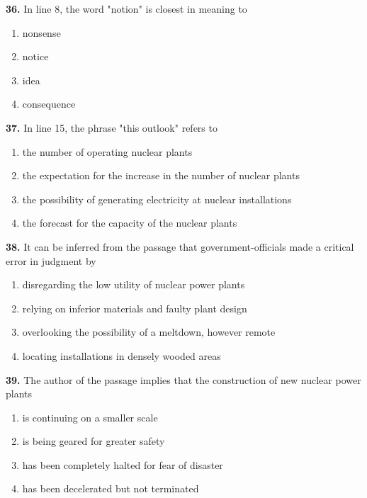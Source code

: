\documentclass[12pt]{article}
\begin{document}
\par
\vspace{0.25\baselineskip}
\noindent\textbf{36.} In line 8, the word "notion" is closest in meaning to
\begin{enumerate}[label=(\Alph*),leftmargin=*,itemsep=0.2em]
\item nonsense
\item notice
\item idea
\item consequence
\end{enumerate}
\par
\vspace{0.25\baselineskip}
\noindent\textbf{37.} In line 15, the phrase "this outlook" refers to
\begin{enumerate}[label=(\Alph*),leftmargin=*,itemsep=0.2em]
\item the number of operating nuclear plants
\item the expectation for the increase in the number of nuclear plants
\item the possibility of generating electricity at nuclear installations
\item the forecast for the capacity of the nuclear plants
\end{enumerate}
\par
\vspace{0.25\baselineskip}
\noindent\textbf{38.} It can be inferred from the passage that government-officials made a critical error in judgment by
\begin{enumerate}[label=(\Alph*),leftmargin=*,itemsep=0.2em]
\item disregarding the low utility of nuclear power plants
\item relying on inferior materials and faulty plant design
\item overlooking the possibility of a meltdown, however remote
\item locating installations in densely wooded areas
\end{enumerate}
\par
\vspace{0.25\baselineskip}
\noindent\textbf{39.} The author of the passage implies that the construction of new nuclear power plants
\begin{enumerate}[label=(\Alph*),leftmargin=*,itemsep=0.2em]
\item is continuing on a smaller scale
\item is being geared for greater safety
\item has been completely halted for fear of disaster
\item has been decelerated but not terminated
\end{enumerate}
\end{document}
